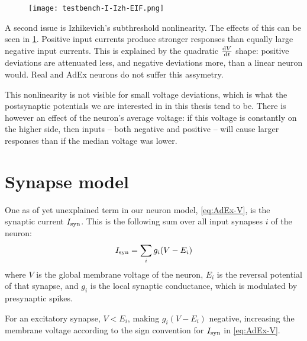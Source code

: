 \begin{figure}
    \hspace*{10em}
    \texttt{[image: testbench-I-Izh-EIF.png]}
    \label{fig:testbench-I-Izh-EIF}
\end{figure}

A second issue is Izhikevich's subthreshold nonlinearity. The effects of this can be seen in \cref{fig:testbench-I-Izh-EIF}. Positive input currents produce stronger responses than equally large negative input currents. This is explained by the quadratic $\frac{\mathrm{d}V}{\mathrm{d}t}$ shape: positive deviations are attenuated less, and negative deviations more, than a linear neuron would. Real and AdEx neurons do not suffer this assymetry.

This nonlinearity is not visible for small voltage deviations, which is what the postsynaptic potentials we are interested in in this thesis tend to be. There is however an effect of the neuron's average voltage: if this voltage is constantly on the higher side, then inputs -- both negative and positive -- will cause larger responses than if the median voltage was lower.


\clearpage
\section{Synapse model}
\label{sec:synapse_model}

One as of yet unexplained term in our neuron model, \cref{eq:AdEx-V}, is the synaptic current $I_{\text{syn}}$.
This is the following sum over all input synapses $i$ of the neuron:
\begin{equation}
    I_{\text{syn}} = \sum_i g_i (V - E_i)
    \label{eq:I_syn}
\end{equation}
where $V$ is the global membrane voltage of the neuron, $E_i$ is the reversal potential of that synapse, and $g_i$ is the local synaptic conductance, which is modulated by presynaptic spikes.

For an excitatory synapse, $V < E_i$, making $g_i (V - E_i)$ negative, increasing the membrane voltage according to the sign convention for $I_{\text{syn}}$ in \cref{eq:AdEx-V}.

